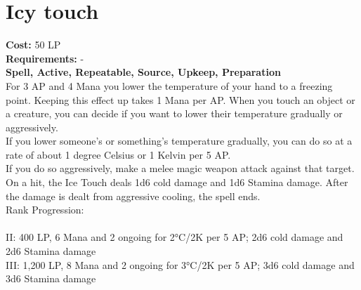 \section{Icy touch}\label{spell:icyTouch}
\textbf{Cost:} 50 LP\\
\textbf{Requirements:} -\\
\textbf{Spell, Active, Repeatable, Source, Upkeep, Preparation}\\
For 3 AP and 4 Mana you lower the temperature of your hand to a freezing point.
Keeping this effect up takes 1 Mana per AP.
When you touch an object or a creature, you can decide if you want to lower their temperature gradually or aggressively.\\
If you lower someone's or something's temperature gradually, you can do so at a rate of about 1 degree Celsius or 1 Kelvin per 5 AP.\\
If you do so aggressively, make a melee magic weapon attack against that target.
On a hit, the Ice Touch deals 1d6 cold damage and 1d6 Stamina damage.
After the damage is dealt from aggressive cooling, the spell ends.
\\
Rank Progression:\\
\\
II: 400 LP, 6 Mana and 2 ongoing for 2°C/2K per 5 AP; 2d6 cold damage and 2d6 Stamina damage\\
III: 1,200 LP, 8 Mana and 2 ongoing for 3°C/2K per 5 AP; 3d6 cold damage and 3d6 Stamina damage\\